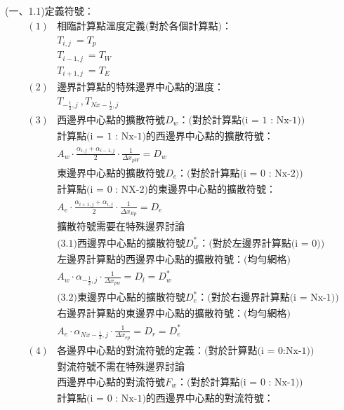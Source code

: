 \documentclass[12pt]{article}
\begin{document}
\noindent (一、1.1)定義符號：\\
\begin{equation}\
    \begin{split}
        (1)&\mbox{相臨計算點溫度定義(對於各個計算點)：}\\
        &T_{i,j}\ = T_{p}\\
        &T_{i-1,j}\ = T_{W} \\
        &T_{i+1,j}\ = T_{E} \\
        (2)&\mbox{邊界計算點的特殊邊界中心點的溫度：}\\
        &T_{-\frac{1}{2},j}\ ,T_{Nx-\frac{1}{2},j}\\
        (3)&\mbox{西邊界中心點的擴散符號$D_{w}$：(對於計算點(i = 1 : Nx-1))}\\
        &\mbox{計算點(i = 1 : Nx-1)的西邊界中心點的擴散符號：}\\
        &A_{w}\cdot \frac{\alpha_{i,j}+\alpha_{i-1,j}}{2}\cdot \frac{1}{\Delta x_{pW}} = D_{w}\\
        &\mbox{東邊界中心點的擴散符號$D_{e}$：(對於計算點(i = 0 : Nx-2))}\\
        &\mbox{計算點(i = 0 : NX-2)的東邊界中心點的擴散符號：}\\
        &A_{e}\cdot \frac{\alpha_{i+1,j}+\alpha_{i,j}}{2}\cdot \frac{1}{\Delta x_{Ep}} = D_{e}\\
        &\mbox{擴散符號需要在特殊邊界討論}\\
        &\mbox{(3.1)西邊界中心點的擴散符號$D_{w}^{*}$：(對於左邊界計算點(i = 0))}\\
        &\mbox{左邊界計算點的西邊界中心點的擴散符號：(均勻網格)}\\
        &A_{w}\cdot \alpha_{-\frac{1}{2},j} \cdot \frac{1}{\Delta x_{pw}} = D_{l} = D_{w}^{*}\\
        &\mbox{(3.2)東邊界中心點的擴散符號$D_{e}^{*}$：(對於右邊界計算點(i = Nx-1))}\\
        &\mbox{右邊界計算點的東邊界中心點的擴散符號：(均勻網格)}\\
        &A_{e}\cdot \alpha_{Nx-\frac{1}{2},j} \cdot \frac{1}{\Delta x_{ep}} = D_{r} = D_{e}^{*}\\
        (4)&\mbox{各邊界中心點的對流符號的定義：(對於計算點(i = 0:Nx-1))}\\
        &\mbox{對流符號不需在特殊邊界討論}\\
        &\mbox{西邊界中心點的對流符號$F_{w}$：(對於計算點(i = 0 : Nx-1))}\\
        &\mbox{計算點(i = 0 : Nx-1)的西邊界中心點的對流符號：}\\

\end{split}
\end{equation}
\end{document}
